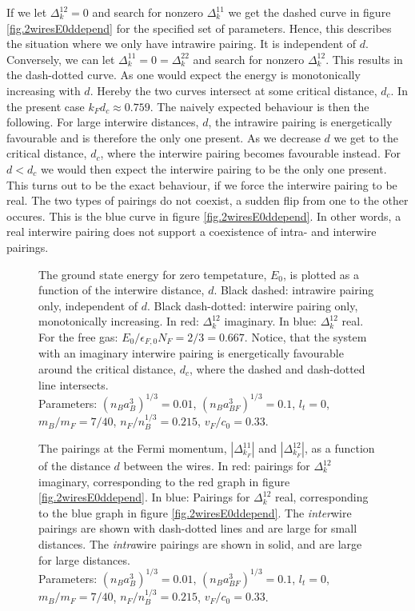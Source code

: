 If we let $\Delta^{12}_k = 0$ and search for nonzero $\Delta^{11}_k$ we get the dashed curve in figure \ref{fig.2wiresE0ddepend} for the specified set of parameters. Hence, this describes the situation where we only have intrawire pairing. It is independent of $d$. Conversely, we can let $\Delta^{11}_k = 0 = \Delta^{22}_k$ and search for nonzero $\Delta^{12}_k$. This results in the dash-dotted curve. As one would expect the energy is monotonically increasing with $d$. Hereby the two curves intersect at some critical distance, $d_c$. In the present case $k_Fd_c \approx 0.759$. The naively expected behaviour is then the following. For large interwire distances, $d$, the intrawire pairing is energetically favourable and is therefore the only one present. As we decrease $d$ we get to the critical distance, $d_c$, where the interwire pairing becomes favourable instead. For $d < d_c$ we would then expect the interwire pairing to be the only one present. This turns out to be the exact behaviour, if we force the interwire pairing to be real. The two types of pairings do not coexist, a sudden flip from one to the other occures. This is the blue curve in figure \ref{fig.2wiresE0ddepend}. In other words, a real interwire pairing does not support a coexistence of intra- and interwire pairings. 

\begin{figure} 
\begin{center}  
  
\caption{The ground state energy for zero tempetature, $E_0$, is plotted as a function of the interwire distance, $d$. Black dashed: intrawire pairing only, independent of $d$. Black dash-dotted: interwire pairing only, monotonically increasing. In red: $\Delta^{12}_k$ imaginary. In blue: $\Delta^{12}_k$ real. For the free gas: $E_0/\epsilon_{F,0}N_F = 2/3 = 0.667$. Notice, that the system with an imaginary interwire pairing is energetically favourable around the critical distance, $d_c$, where the dashed and dash-dotted line intersects. \\
Parameters: $(n_Ba_B^3)^{1/3} = 0.01$, $(n_Ba_{BF}^3)^{1/3} = 0.1$, $l_t = 0$, $m_B / m_F = 7/40$, $n_F / n_B^{1/3} = 0.215$, $v_F/c_0 = 0.33$. }  
\label{fig.2wiresE0ddepend}  
\vspace{0.5cm}
  
\caption{The pairings at the Fermi momentum, $\left|\Delta^{11}_{k_F}\right|$ and $\left|\Delta^{12}_{k_F}\right|$, as a function of the distance $d$ between the wires. In red: pairings for $\Delta^{12}_k$ imaginary, corresponding to the red graph in figure \ref{fig.2wiresE0ddepend}. In blue: Pairings for $\Delta^{12}_k$ real, corresponding to the blue graph in figure \ref{fig.2wiresE0ddepend}. The \textit{inter}wire pairings are shown with dash-dotted lines and are large for small distances. The \textit{intra}wire pairings are shown in solid, and are large for large distances. \\
Parameters: $(n_Ba_B^3)^{1/3} = 0.01$, $(n_Ba_{BF}^3)^{1/3} = 0.1$, $l_t = 0$, $m_B / m_F = 7/40$, $n_F / n_B^{1/3} = 0.215$, $v_F/c_0 = 0.33$. }
\label{fig.2wiresMaximalPairingddepend}
\end{center}
\end{figure}

